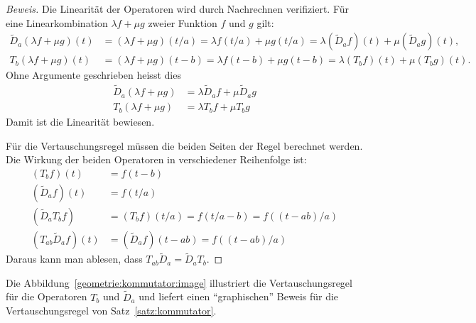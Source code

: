 \begin{proof}[Beweis]
Die Linearität der Operatoren wird durch Nachrechnen verifiziert.
Für eine Linearkombination $\lambda f+\mu g$ zweier Funktion $f$ und $g$ gilt:
\begin{align*}
\tilde{D}_a(\lambda f+\mu g)(t)
&=
(\lambda f+\mu g)(t/a)
=
\lambda f(t/a)+\mu g(t/a)
=
\lambda (\tilde{D}_af)(t)+\mu (\tilde{D}_ag)(t),
\\
T_b(\lambda f+ \mu g)(t)
&=
(\lambda f+\mu g)(t-b)
=
\lambda f(t-b)+\mu g(t-b)
=
\lambda (T_bf)(t)+\mu (T_bg)(t).
\end{align*}
Ohne Argumente geschrieben heisst dies
\begin{align*}
\tilde{D}_a(\lambda f+\mu g) &= \lambda \tilde{D}_af + \mu \tilde{D}_ag
\\
T_b(\lambda f+\mu g) &= \lambda T_bf + \mu T_bg
\end{align*}
Damit ist die Linearität bewiesen.

Für die Vertauschungsregel müssen die beiden Seiten der Regel
berechnet werden.
Die Wirkung der beiden Operatoren in verschiedener Reihenfolge
ist:
\begin{align*}
(T_bf)(t)
&=
f(t-b)
\\
(\tilde{D}_af)(t)
&=
f(t/a)
\\
(\tilde{D}_aT_bf)
&=
(T_bf)(t/a)
=
f(t/a-b)
=
f((t-ab)/a)
\\
(T_{ab}\tilde{D}_a f)(t)
&=
(\tilde{D}_af)(t - ab)
=
f((t-ab)/a)
\end{align*}
Daraus kann man ablesen, dass $T_{ab}\tilde{D}_a=\tilde{D}_aT_b$.
\end{proof}

Die Abbildung~\ref{geometrie:kommutator:image} illustriert die
Vertauschungsregel für die Operatoren $T_b$ und $\tilde{D}_a$ und liefert
einen ``graphischen'' Beweis für die Vertauschungsregel von
Satz~\ref{satz:kommutator}.

%
%
%
